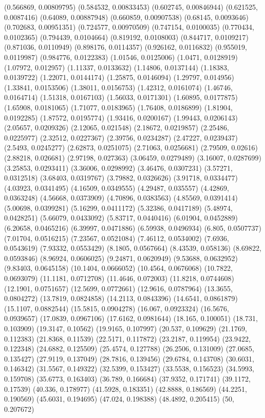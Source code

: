 {(0.566869, 0.00809795)
(0.584532, 0.00833453)
(0.602745, 0.00846944)
(0.621525, 0.0087416)
(0.64089, 0.00887948)
(0.660859, 0.00907538)
(0.68145, 0.0093646)
(0.702683, 0.00951351)
(0.724577, 0.00970509)
(0.747154, 0.0100035)
(0.770434, 0.0102365)
(0.794439, 0.0104664)
(0.819192, 0.0108003)
(0.844717, 0.0109217)
(0.871036, 0.0110949)
(0.898176, 0.0114357)
(0.926162, 0.0116832)
(0.955019, 0.0119987)
(0.984776, 0.0122383)
(1.01546, 0.0125006)
(1.0471, 0.0128919)
(1.07972, 0.012957)
(1.11337, 0.0133632)
(1.14806, 0.0137144)
(1.18383, 0.0139722)
(1.22071, 0.0144174)
(1.25875, 0.0146094)
(1.29797, 0.014956)
(1.33841, 0.0153506)
(1.38011, 0.0156753)
(1.42312, 0.0161074)
(1.46746, 0.0164714)
(1.51318, 0.0167103)
(1.56033, 0.0171301)
(1.60895, 0.0177875)
(1.65908, 0.0181065)
(1.71077, 0.0183965)
(1.76408, 0.0186899)
(1.81904, 0.0192285)
(1.87572, 0.0195774)
(1.93416, 0.0200167)
(1.99443, 0.0206143)
(2.05657, 0.0209326)
(2.12065, 0.021548)
(2.18672, 0.0219857)
(2.25486, 0.0225977)
(2.32512, 0.0227367)
(2.39756, 0.0234287)
(2.47227, 0.0239437)
(2.5493, 0.0245277)
(2.62873, 0.0251075)
(2.71063, 0.0256681)
(2.79509, 0.02616)
(2.88218, 0.026681)
(2.97198, 0.027363)
(3.06459, 0.0279489)
(3.16007, 0.0287699)
(3.25853, 0.0293411)
(3.36006, 0.0298992)
(3.46476, 0.0307231)
(3.57271, 0.0312518)
(3.68403, 0.0319767)
(3.79882, 0.0326626)
(3.91718, 0.0334477)
(4.03923, 0.0341495)
(4.16509, 0.0349555)
(4.29487, 0.035557)
(4.42869, 0.0363248)
(4.56668, 0.0373909)
(4.70896, 0.0383563)
(4.85569, 0.0391414)
(5.00698, 0.0399281)
(5.16299, 0.0411172)
(5.32386, 0.0417189)
(5.48974, 0.0428251)
(5.66079, 0.0433092)
(5.83717, 0.0440416)
(6.01904, 0.0452889)
(6.20658, 0.0465216)
(6.39997, 0.0471886)
(6.59938, 0.0496934)
(6.805, 0.0507737)
(7.01704, 0.0516215)
(7.23567, 0.0521084)
(7.46112, 0.0534002)
(7.6936, 0.0543619)
(7.93332, 0.0553429)
(8.1805, 0.0567664)
(8.43539, 0.058136)
(8.69822, 0.0593846)
(8.96924, 0.0606025)
(9.24871, 0.0620949)
(9.53688, 0.0632952)
(9.83403, 0.0645158)
(10.1404, 0.0666052)
(10.4564, 0.0676068)
(10.7822, 0.0693079)
(11.1181, 0.0712708)
(11.4646, 0.072003)
(11.8218, 0.0744608)
(12.1901, 0.0751657)
(12.5699, 0.0772661)
(12.9616, 0.0787964)
(13.3655, 0.0804272)
(13.7819, 0.0824858)
(14.2113, 0.0843396)
(14.6541, 0.0861879)
(15.1107, 0.0882544)
(15.5815, 0.0904278)
(16.067, 0.0923324)
(16.5676, 0.0939657)
(17.0839, 0.0967106)
(17.6162, 0.0981644)
(18.165, 0.100051)
(18.731, 0.103909)
(19.3147, 0.10562)
(19.9165, 0.107997)
(20.537, 0.109629)
(21.1769, 0.112383)
(21.8368, 0.11539)
(22.5171, 0.117872)
(23.2187, 0.119954)
(23.9422, 0.122348)
(24.6882, 0.125509)
(25.4574, 0.127788)
(26.2506, 0.131009)
(27.0685, 0.135427)
(27.9119, 0.137049)
(28.7816, 0.139456)
(29.6784, 0.143708)
(30.6031, 0.146342)
(31.5567, 0.149322)
(32.5399, 0.153427)
(33.5538, 0.156523)
(34.5993, 0.159708)
(35.6773, 0.163403)
(36.789, 0.166684)
(37.9352, 0.171741)
(39.1172, 0.17539)
(40.336, 0.178977)
(41.5928, 0.183351)
(42.8888, 0.186569)
(44.2251, 0.190569)
(45.6031, 0.194695)
(47.024, 0.198388)
(48.4892, 0.205415)
(50, 0.207672)
}

